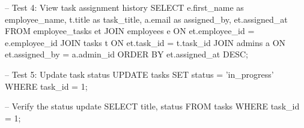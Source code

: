 -- Test 4: View task assignment history
SELECT 
    e.first_name as employee_name,
    t.title as task_title,
    a.email as assigned_by,
    et.assigned_at
FROM employee_tasks et
JOIN employees e ON et.employee_id = e.employee_id
JOIN tasks t ON et.task_id = t.task_id
JOIN admins a ON et.assigned_by = a.admin_id
ORDER BY et.assigned_at DESC;

-- Test 5: Update task status
UPDATE tasks 
SET status = 'in_progress' 
WHERE task_id = 1;

-- Verify the status update
SELECT title, status FROM tasks WHERE task_id = 1;